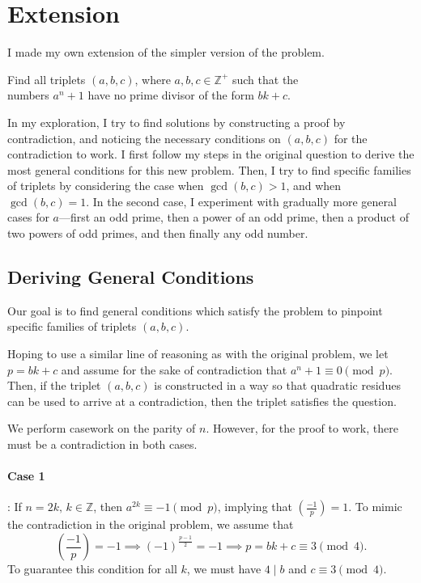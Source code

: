 \documentclass{article}
\newcommand{\Z}{\mathbb{Z}}
\newcommand{\qrn}[2]{\left( \frac{#1}{#2}\right)}
\begin{document}
\section{Extension}
\label{extension}
I made my own extension of the simpler version of the problem.
\begin{center}
    Find all triplets $(a,b,c)$, where $a, b, c \in \Z^+$ such that the \\ numbers $a^n+1$ have no prime divisor of the form $bk+c$.
\end{center}
In my exploration, I try to find solutions by constructing a proof by contradiction, and noticing the necessary conditions on $(a,b,c)$ for the contradiction to work. I first follow my steps in the original question to derive the most general conditions for this new problem. Then, I try to find specific families of triplets by considering the case when $\gcd(b,c) > 1$, and when $\gcd(b,c) = 1$. In the second case, I experiment with gradually more general cases for $a$---first an odd prime, then a power of an odd prime, then a product of two powers of odd primes, and then finally any odd number.

\subsection{Deriving General Conditions}
Our goal is to find general conditions which satisfy the problem to pinpoint specific families of triplets $(a,b,c)$.

Hoping to use a similar line of reasoning as with the original problem, we let $p=bk+c$ and assume for the sake of contradiction that $a^n+1 \equiv 0 \pmod p$. Then, if the triplet $(a,b,c)$ is constructed in a way so that quadratic residues can be used to arrive at a contradiction, then the triplet satisfies the question.

We perform casework on the parity of $n$. However, for the proof to work, there must be a contradiction in both cases.

\paragraph{Case 1}: If $n=2k, \hspace{2pt} k \in \Z$, then $a^{2k} \equiv -1 \pmod p$, implying that $\qrn{-1}{p} = 1$. To mimic the contradiction in the original problem, we assume that \[\qrn{-1}{p} = -1 \implies (-1)^{\frac{p-1}{2}} = -1 \implies p = bk+c \equiv 3 \pmod 4.\] To guarantee this condition for all $k$, we must have $4 \mid b$ and $c \equiv 3 \pmod 4$.
\end{document}
